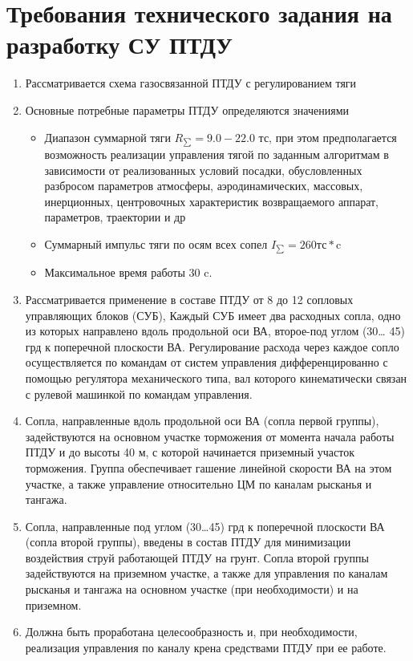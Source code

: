 \section{Требования технического задания на разработку СУ ПТДУ}

\begin{enumerate}
	\item Рассматривается схема газосвязанной ПТДУ с регулированием тяги
	
	\item Основные потребные параметры ПТДУ определяются значениями
	\begin{itemize}
		\item Диапазон суммарной тяги $R_{\sum} = 9.0 - 22.0$ тс, при этом предполагается возможность реализации управления тягой по заданным алгоритмам в зависимости от реализованных условий посадки, обусловленных разбросом параметров атмосферы, аэродинамических, массовых, инерционных, центровочных характеристик возвращаемого аппарат, параметров, траектории и др
		\item Суммарный импульс тяги по осям всех сопел $I_{\sum} = 260 \text{тс}*\text{c}$
		\item Максимальное время работы $30$ c.
	\end{itemize}
	\item Рассматривается применение в составе ПТДУ от 8 до 12 сопловых управляющих блоков (СУБ), Каждый СУБ имеет два расходных сопла, одно из которых направлено вдоль продольной оси ВА, второе-под углом (30… 45) грд к поперечной плоскости ВА. Регулирование расхода через каждое сопло осуществляется по командам от систем управления дифференцированно с помощью регулятора механического типа, вал которого кинематически связан с рулевой машинкой по командам управления.
	
	\item Сопла, направленные вдоль продольной оси ВА (сопла первой группы), задействуются на основном участке торможения от момента начала работы ПТДУ и до высоты 40 м, с которой начинается приземный участок торможения. Группа обеспечивает гашение линейной скорости ВА на этом участке, а также управление относительно ЦМ по каналам рысканья и тангажа.
	
	\item Сопла, направленные под углом (30…45) грд к поперечной плоскости ВА (сопла второй группы), введены в состав ПТДУ для минимизации воздействия струй работающей ПТДУ на грунт. Сопла второй группы задействуются на приземном участке, а также для управления по каналам рысканья и тангажа на основном участке (при необходимости) и на приземном.
	
	\item Должна быть проработана целесообразность и, при необходимости, реализация управления по каналу крена средствами ПТДУ при ее работе.
\end{enumerate}
\clearpage

